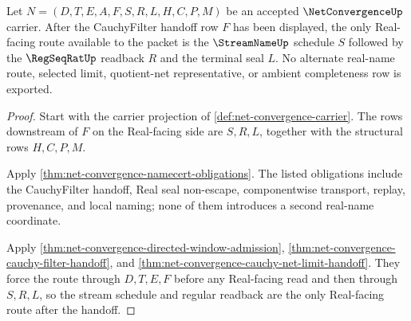 \begin{theorem}
\label{thm:net-convergence-stream-readback-route}
Let $N=(D,T,E,A,F,S,R,L,H,C,P,M)$ be an accepted $\NetConvergenceUp$ carrier. After the CauchyFilter handoff row $F$ has been displayed, the only Real-facing route available to the packet is the $\StreamNameUp$ schedule $S$ followed by the $\RegSeqRatUp$ readback $R$ and the terminal seal $L$. No alternate real-name route, selected limit, quotient-net representative, or ambient completeness row is exported.
\end{theorem}
\begin{proof}
Start with the carrier projection of \autoref{def:net-convergence-carrier}. The rows downstream of $F$ on the Real-facing side are $S,R,L$, together with the structural rows $H,C,P,M$.

Apply \autoref{thm:net-convergence-namecert-obligations}. The listed obligations include the CauchyFilter handoff, Real seal non-escape, componentwise transport, replay, provenance, and local naming; none of them introduces a second real-name coordinate.

Apply \autoref{thm:net-convergence-directed-window-admission}, \autoref{thm:net-convergence-cauchy-filter-handoff}, and \autoref{thm:net-convergence-cauchy-net-limit-handoff}. They force the route through $D,T,E,F$ before any Real-facing read and then through $S,R,L$, so the stream schedule and regular readback are the only Real-facing route after the handoff.
\end{proof}

